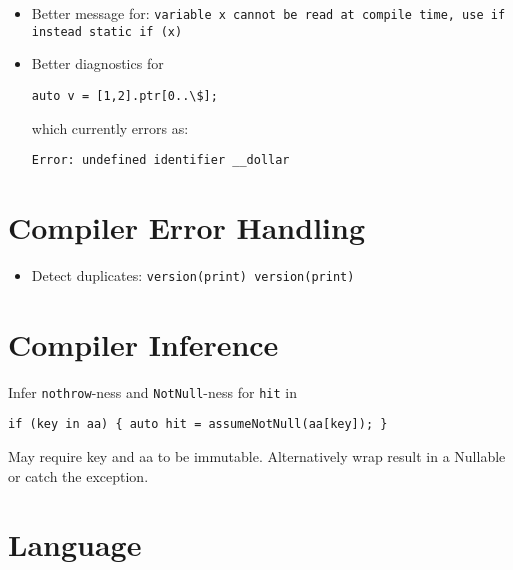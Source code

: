 \documentclass[xcolor=dvipsnames, twocolumn]{article}
\begin{document}
\begin{itemize}
\item Better message for:
\texttt{variable x cannot be read at compile time, use if instead static if (x)}

\item Better diagnostics for
\begin{lstlisting}[frame=single]
auto v = [1,2].ptr[0..\$];
\end{lstlisting}
which currently errors as:
\begin{lstlisting}[frame=single]
Error: undefined identifier __dollar
\end{lstlisting}

\end{itemize}

\section{Compiler Error Handling}

\begin{itemize}
\item Detect duplicates: \texttt{version(print) version(print)}
\end{itemize}

\section{Compiler Inference}

\item Infer \texttt{nothrow}-ness and \texttt{NotNull}-ness for \texttt{hit} in
\begin{lstlisting}[frame=single]
if (key in aa) { auto hit = assumeNotNull(aa[key]); }
\end{lstlisting}
May require key and aa to be immutable. Alternatively wrap result in a Nullable
or catch the exception.

\section{Language}
\end{document}
